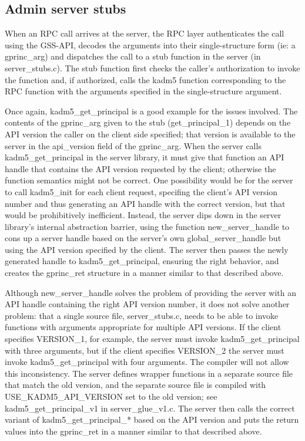 \subsection{Admin server stubs}

When an RPC call arrives at the server, the RPC layer authenticates
the call using the GSS-API, decodes the arguments into their
single-structure form (ie: a gprinc_arg) and dispatches the call to a
stub function in the server (in server_stubs.c).  The stub function
first checks the caller's authorization to invoke the function and, if
authorized, calls the kadm5 function corresponding to the RPC function
with the arguments specified in the single-structure argument.

Once again, kadm5_get_principal is a good example for the issues
involved.  The contents of the gprinc_arg given to the stub
(get_principal_1) depends on the API version the caller on the client
side specified; that version is available to the server in the
api_version field of the gprinc_arg.  When the server calls
kadm5_get_principal in the server library, it must give that function
an API handle that contains the API version requested by the client;
otherwise the function semantics might not be correct.  One
possibility would be for the server to call kadm5_init for each client
request, specifing the client's API version number and thus generating
an API handle with the correct version, but that would be
prohibitively inefficient.  Instead, the server dips down in the
server library's internal abstraction barrier, using the function
new_server_handle to cons up a server handle based on the server's own
global_server_handle but using the API version specified by the
client.  The server then passes the newly generated handle to
kadm5_get_principal, ensuring the right behavior, and creates the
gprinc_ret structure in a manner similar to that described above.

Although new_server_handle solves the problem of providing the server
with an API handle containing the right API version number, it does
not solve another problem: that a single source file, server_stubs.c,
needs to be able to invoke functions with arguments appropriate for
multiple API versions.  If the client specifies VERSION_1, for
example, the server must invoke kadm5_get_principal with three
arguments, but if the client specifies VERSION_2 the server must
invoke kadm5_get_principal with four arguments.  The compiler will not
allow this inconsistency.  The server defines wrapper functions in a
separate source file that match the old version, and the separate
source file is compiled with USE_KADM5_API_VERSION set to the old
version; see kadm5_get_principal_v1 in server_glue_v1.c.  The server
then calls the correct variant of kadm5_get_principal_* based on the
API version and puts the return values into the gprinc_ret in a manner
similar to that described above.

